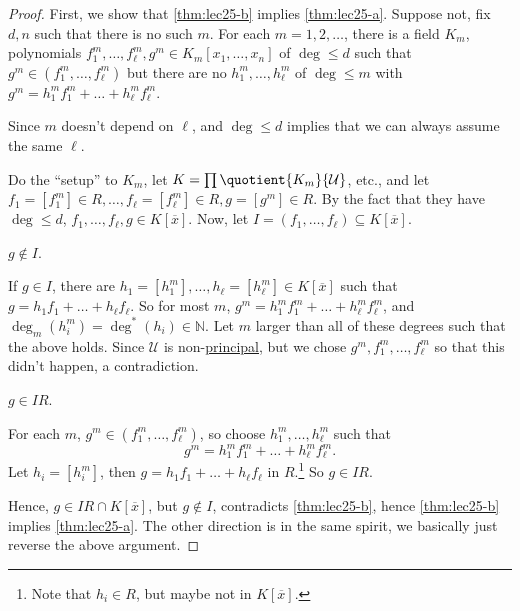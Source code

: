 \begin{proof}
	First, we show that \autoref{thm:lec25-b} implies \autoref{thm:lec25-a}. Suppose not, fix \(d, n\) such that there is no such \(m\). For each \(m = 1, 2, \dots \), there is a field \(K_m\), polynomials \(f_1^m, \dots , f_{\ell }^m, g^m \in K_m[x_1, \dots , x_n]\) of \(\deg \leq d\) such that \(g^m\in (f_1^m, \dots , f_{\ell }^m )\) but there are no \(h_1^m, \dots , h_{\ell } ^m \) of \(\deg \leq m\) with \(g^m = h_1^m f_1^m + \dots + h_{\ell }^m f_{\ell }^m \).

	\begin{remark}
		Since \(m\) doesn't depend on \(\ell \), and \(\deg \leq d\) implies that we can always assume the same \(\ell \).
	\end{remark}

	Do the ``setup'' to \(K_m\), let \(K = \prod \quotient{K_m}{\mathcal{U} } \), etc., and let \(f_1 = [f_1^{m} ]\in R, \dots , f_{\ell } = [f_{\ell }^m ]\in R , g = [g^m]\in R\). By the fact that they have \(\deg \leq d\), \(f_1, \dots , f_{\ell }, g\in K[\overline{x} ] \). Now, let \(I = (f_1, \dots , f_{\ell } ) \subseteq K[\overline{x} ]\).

	\begin{claim}
		\(g \notin I\).
	\end{claim}
	\begin{explanation}
		If \(g\in I\), there are \(h_1 = [h_1^m], \dots , h_{\ell } = [h_{\ell }^m ] \in K[\overline{x} ]\) such that \(g = h_1 f_1 + \dots + h_{\ell } f_{\ell } \). So for most \(m\), \(g^m = h_1^m f_1^m + \dots + h_{\ell }^m f_{\ell }^m \), and \(\deg_m(h_i^m) = \deg^{\ast} (h_i) \in \mathbb{N} \). Let \(m\) larger than all of these degrees such that the above holds. Since \(\mathcal{U} \) is non-\hyperref[eg:principal-filter]{principal}, but we chose \(g^m, f_1^m, \dots , f_{\ell }^m \) so that this didn't happen, a contradiction.
	\end{explanation}

	\begin{claim}
		\(g\in IR\).
	\end{claim}
	\begin{explanation}
		For each \(m\), \(g^m \in (f_1^m, \dots , f_{\ell }^m )\), so choose \(h_1^m, \dots , h_{\ell }^m \) such that
		\[
			g^m = h_1^m f_1^m + \dots + h_{\ell } ^m f_{\ell } ^m.
		\]
		Let \(h_i = [h_i^m]\), then \(g = h_1 f_1 + \dots + h_{\ell } f_{\ell } \) in \(R\).\footnote{Note that \(h_i\in R\), but maybe not in \(K[\overline{x} ]\).} So \(g\in IR\).
	\end{explanation}

	Hence, \(g\in IR \cap K[\overline{x} ]\), but \(g \notin I\), contradicts \autoref{thm:lec25-b}, hence \autoref{thm:lec25-b} implies \autoref{thm:lec25-a}. The other direction is in the same spirit, we basically just reverse the above argument.
\end{proof}

